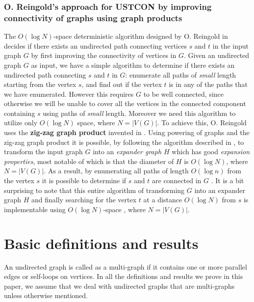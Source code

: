 \documentclass{article}
\begin{document}
\subsubsection{O. Reingold's approach for USTCON by improving connectivity of graphs using graph products}
The $O(\log N)$-space deterministic algorithm designed by O. Reingold in \cite{Rei2008} decides if there exists an undirected path connecting vertices $s$ and $t$ in the input graph $G$ by first improving the connectivity of vertices in $G$. Given an undirected graph $G$ as input, we have a simple algorithm to determine if there exists an undirected path connecting $s$ and $t$ in $G$: enumerate all paths of {\it small} length starting from the vertex $s$, and find out if the vertex $t$ is in any of the paths that we have enumerated. However this requires $G$ to be well connected, since otherwise we will be unable to cover all the vertices in the connected component containing $s$ using paths of {\it small} length. Moreover we need this algorithm to utilize only $O(\log N)$ space, where $N=|V(G)|$. To achieve this, O. Reingold uses the {\bf{zig-zag graph product}} invented in \cite{RVW2002}. Using powering of graphs and the zig-zag graph product it is possible, by following the algorithm described in \cite{Rei2008}, to transform the input graph $G$ into an {\it{expander graph $H$}} which has good {\it{expansion properties}}, most notable of which is that the diameter of $H$ is $O(\log N)$, where $N=|V(G)|$. As a result, by enumerating all paths of length $O(\log n)$ from the vertex $s$ it is possible to determine if $s$ and $t$ are connected in $G$ \cite{Rei2008}. It is a bit surprising to note that this entire algorithm of transforming $G$ into an expander graph $H$ and finally searching for the vertex $t$ at a distance $O(\log N)$ from $s$ is implementable using $O(\log N)$-space \cite{Rei2008}, where $N=|V(G)|$.

\section{Basic definitions and results}
An undirected graph is called as a multi-graph if it contains one or more parallel edges or self-loops on vertices. In all the definitions and results we prove in this paper, we assume that we deal with undirected graphs that are multi-graphs unless otherwise mentioned.
\end{document}
